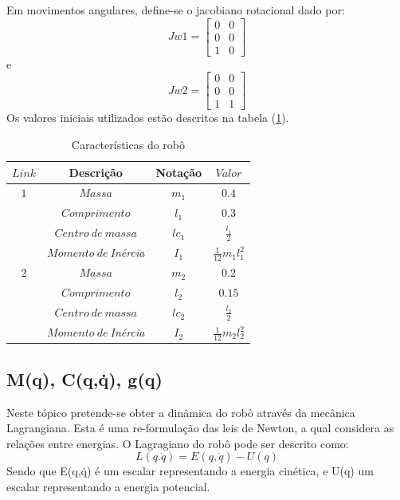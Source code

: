\documentclass[a4paper,twocolumn,final,11pt]{article}
\let\oldref\ref
\renewcommand{\ref}[1]{(\oldref{#1})}
\begin{document}
Em movimentos angulares, define-se o jacobiano rotacional dado por:
\begin{equation}
Jw1=
\begin{bmatrix}
0 & 0 \\
0 & 0\\
1 & 0
\end{bmatrix}
\end{equation}
e 
\begin{equation}
Jw2=
\begin{bmatrix}
0 & 0 \\
0 & 0\\
1 & 1
\end{bmatrix}
\end{equation}
Os valores iniciais utilizados estão descritos na tabela \ref{initialvalues}.
\begin{table}[H]
	\centering
	\caption{Características do robô}
	\begin{tabular}{@{}cccc@{}}
		\toprule
		$Link$ & Descrição & Notação  & $Valor$ \\
		\midrule
		$1$ & $Massa$ & $m_1$ & $0.4$  \\
		$ $  & $Comprimento$ & $l_1$ & $0.3$ \\
		$ $  & $Centro~de~massa$ & $lc_1$ & $\frac{l_1}{2}$ \\
		$ $  & $Momento~de~$\textit{Inércia} & $I_1$ & $\frac{1}{12} m_1  l_1^{2} $ \\
		$2$ & $Massa$ & $m_2$ & $0.2$   \\	
		$ $ & $Comprimento$ & $l_2$ & $0.15$   \\
		$ $  & $Centro~de~massa$ & $lc_2$ & $\frac{l_2}{2}$ \\
	    $ $  & $Momento~de~$\textit{Inércia} & $I_2$ & $\frac{1}{12} m_2  l_2^{2} $ \\
		\bottomrule
	\end{tabular}
	\label{initialvalues}
\end{table}
\subsection{M(q), C(q,\.{q}), g(q)}
Neste tópico pretende-se obter a dinâmica do robô através da mecânica Lagrangiana. Esta é uma re-formulação das leis de Newton, a qual considera as relações entre energias.
O Lagragiano do robô pode ser descrito como:
\begin{equation}
   L(q.\dot{q})=E(q,\dot{q})-U(q)
   \label{eqLagranRobo}
\end{equation}
Sendo que E(q,\.{q}) é um escalar representando a energia cinética, e U(q) um escalar representando a energia potencial.
\end{document}
